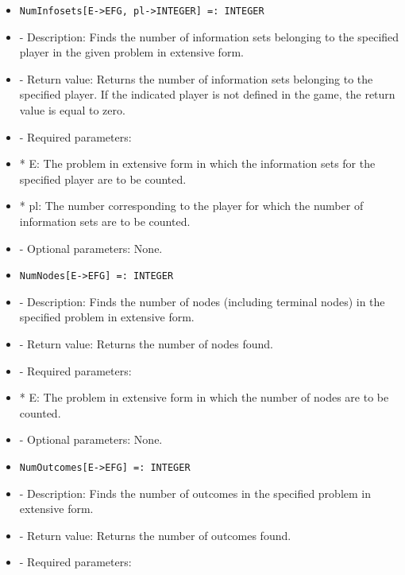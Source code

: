 \begin{itemize}
\item
\begin{verbatim}
NumInfosets[E->EFG, pl->INTEGER] =: INTEGER
\end{verbatim}

\bd
\item
- Description:  Finds the number of information sets belonging to the
specified player in the given problem in extensive form.
\item
- Return value:  Returns the number of information sets belonging to
the specified player.  If the indicated player is not defined in the 
game, the return value is equal to zero.
\item
- Required parameters:

\bd
\item
*  E:  The problem in extensive form in which the information sets
for the specified player are to be counted.	  
\item
*  pl:  The number corresponding to the player for which the number 
of information sets are to be counted.
\ed
\item
 - Optional parameters:  None.
\ed

\item
\begin{verbatim}
NumNodes[E->EFG] =: INTEGER
\end{verbatim}

\bd
\item
- Description:  Finds the number of nodes (including terminal nodes) in 
the specified problem in extensive form.
\item
- Return value:  Returns the number of nodes found.
\item
- Required parameters:

\bd
\item
*  E:  The problem in extensive form in which the number of nodes are
to be counted.
\ed

\item
- Optional parameters:  None.
\ed

\item
\begin{verbatim}
NumOutcomes[E->EFG] =: INTEGER
\end{verbatim}

\bd
\item
- Description:  Finds the number of outcomes in the specified problem in
extensive form.
\item
- Return value:  Returns the number of outcomes found.
\item
- Required parameters:
	  


\end{itemize}
